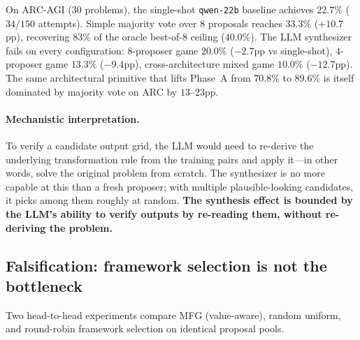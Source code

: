 \documentclass[11pt]{amsart}
\newcommand\1{{\mathds{1}}}
\theoremstyle{definition}
\theoremstyle{remark}
\numberwithin{equation}{section}
\begin{document}
On ARC-AGI ($30$ problems), the single-shot \texttt{qwen-22b} baseline achieves $22.7\%$ ($34/150$ attempts).
Simple majority vote over $8$ proposals reaches $33.3\%$ ($+10.7$pp), recovering $83\%$ of the oracle best-of-$8$ ceiling ($40.0\%$).
The LLM synthesizer fails on every configuration: $8$-proposer game $20.0\%$ ($-2.7$pp vs single-shot), $4$-proposer game $13.3\%$ ($-9.4$pp), cross-architecture mixed game $10.0\%$ ($-12.7$pp).
The same architectural primitive that lifts Phase~A from $70.8\%$ to $89.6\%$ is itself dominated by majority vote on ARC by $13$--$23$pp.

\paragraph{Mechanistic interpretation.}
To verify a candidate output grid, the LLM would need to re-derive the underlying transformation rule from the training pairs and apply it---in other words, solve the original problem from scratch.
The synthesizer is no more capable at this than a fresh proposer; with multiple plausible-looking candidates, it picks among them roughly at random.
\textbf{The synthesis effect is bounded by the LLM's ability to verify outputs by re-reading them, without re-deriving the problem.}

\subsection{Falsification: framework selection is not the bottleneck}\label{sec:results-falsification}

Two head-to-head experiments compare MFG (value-aware), random uniform, and round-robin framework selection on identical proposal pools.
\end{document}
